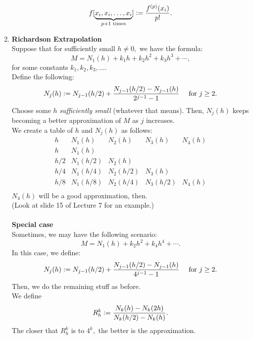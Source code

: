 \documentclass[12pt]{article}
\theoremstyle{definition}
\begin{document}
\begin{enumerate}
	\[f[\underbrace{x_i, x_i, \ldots, x_i}_{p+1 \text{ times}}] \vcentcolon= \dfrac{f^{(p)}(x_i)}{p!}.\]
	\item \label{rich}\textbf{Richardson Extrapolation}\\
	Suppose that for sufficiently small $h \neq 0,$ we have the formula:
	\[M = N_1(h) + k_1h + k_2h^2 + k_3h^3 + \cdots,\]
	for some constants $k_1, k_2, k_3,\ldots.$\\
	Define the following:
	\[N_j(h) \vcentcolon= N_{j-1}(h/2) + \frac{N_{j-1}(h/2) - N_{j-1}(h)}{2^{j-1} - 1} \quad \text{ for } j \ge 2.\]
	Choose some $h$ \emph{sufficiently small} (whatever that means). Then, $N_j(h)$ keeps becoming a better approximation of $M$ as $j$ increases.\\
	We create a table of $h$ and $N_j(h)$ as follows:\\
		\[
		\begin{array}{c|c|c|c|c}
			h & N_1(h) & N_2(h) & N_3(h) & N_4(h)\\
			\hline
			h & N_1(h) & & &\\
			h/2 & N_1(h/2) & N_2(h) & & \\
			h/4 & N_1(h/4) & N_2(h/2) & N_3(h) & \\
			h/8 & N_1(h/8) & N_2(h/4) & N_3(h/2) & N_4(h) \\
		\end{array}
		\]
	$N_4(h)$ will be a good approximation, then.\\
	(Look at slide 15 of Lecture 7 for an example.)\\~\\
	\textbf{Special case}\\
	Sometimes, we may have the following scenario:
	\[M = N_1(h) + k_2h^2 + k_4h^4 + \cdots.\]
	In this case, we define:
	\[N_j(h) \vcentcolon= N_{j-1}(h/2) + \frac{N_{j-1}(h/2) - N_{j-1}(h)}{4^{j-1} - 1} \quad \text{ for } j \ge 2.\]
	Then, we do the remaining stuff as before.\\
	We define 
	\[R_h^k \vcentcolon= \frac{N_k(h) - N_k(2h)}{N_k(h/2) - N_k(h)}.\]
	The closer that $R_h^k$ is to $4^k,$ the better is the approximation.
\end{enumerate}
\end{document}
